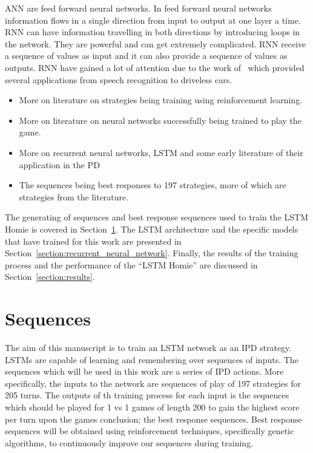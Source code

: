 \documentclass{article}
\begin{document}
ANN are feed forward neural networks. In feed forward neural networks information
flows in a single direction from input to output at one layer a time. RNN
can have information travelling in both directions by introducing loops in the network.
They are powerful and can get extremely complicated. RNN receive a sequence of values
as input and it can also provide a sequence of values as outputs. RNN have gained
a lot of attention due to the work of~\cite{Hochreiter1997} which provided several
applications from speech recognition to driveless cars.

\begin{itemize}
    \item More on literature on strategies being training using reinforcement learning.
    \item More on literature on neural networks successfully being trained to play the game.
    \item More on recurrent neural networks, LSTM and some early literature of their application in the PD
    \item The sequences being best responses to 197 strategies, more of which
    are strategies from the literature.
\end{itemize}

The generating of sequences and best response sequences used to train the LSTM Homie
is covered in Section~\ref{section:sequences}. The LSTM architecture and the specific models that
have trained for this work are presented in Section~\ref{section:recurrent_neural_network}.
Finally, the results of the training process and the performance of the
``LSTM Homie'' are discussed in Section~\ref{section:results}.

\section{Sequences}\label{section:sequences}

The aim of this manuscript is to train an LSTM network as an IPD strategy. LSTMs
are capable of learning and remembering over sequences of inputs. The sequences
which will be used in this work are a series of IPD actions. More specifically,
the inputs to the network are sequences of play of 197 strategies for 205 turns.
The outputs of th training process for each input is the sequences which should be
played for 1 vs 1 games of length 200 to gain the highest score per turn upon
the games conclusion; the best response sequences. Best response sequences will
be obtained using reinforcement techniques, specifically genetic algorithms, to
continuously improve our sequences during training.
\end{document}
